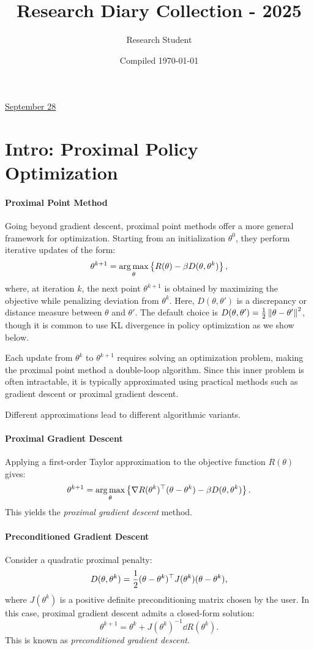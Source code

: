 \documentclass[letterpaper,11pt]{article}
\title{Research Diary Collection - 2025}
\author{Research Student}
\date{Compiled \today}
\begin{document}
\tableofcontents
\thispagestyle{empty}
\newpage


\href{run:2025-09-28-2.tex}{\Huge September 28} 

\section{Intro: Proximal Policy Optimization}

\paragraph{Proximal Point Method} 
Going beyond gradient descent, proximal point methods offer a more general framework for optimization. Starting from an initialization $\theta^0$, they perform iterative updates of the form:
$$
\theta^{k+1} = \argmax_{\theta} 
  \left \{ R(\theta) - \beta D(\theta, \theta^k) \right \},
$$
where, at iteration $k$, the next point $\theta^{k+1}$ is obtained by maximizing the objective while penalizing deviation from $\theta^k$. Here, $D(\theta, \theta')$ is a discrepancy or distance measure between $\theta$ and $\theta'$. The default choice is $D(\theta, \theta') = \frac{1}{2}\norm{\theta - \theta'}^2$, though it is common to use KL divergence in policy optimization as we show below. 

Each update from $\theta^k$ to $\theta^{k+1}$ requires solving an optimization problem, making the proximal point method a double-loop algorithm. Since this inner problem is often intractable, it is typically approximated using practical methods such as gradient descent or proximal gradient descent. 

Different approximations lead to different algorithmic variants.




\paragraph{Proximal Gradient Descent} 
Applying a first-order Taylor approximation to the objective function $R(\theta)$ gives:
$$
\theta^{k+1} = \argmax_{\theta} 
  \left \{ \dd R(\theta^k) \tt (\theta - \theta^k) - \beta D(\theta, \theta^k) \right \}.
$$
This yields the \emph{proximal gradient descent} method.

\paragraph{Preconditioned Gradient Descent}
Consider a quadratic proximal penalty:
$$
D(\theta, \theta^k) = \frac{1}{2}(\theta-\theta^k)\tt J(\theta^k)(\theta - \theta^k),
$$
where $J(\theta^k)$ is a positive definite preconditioning matrix chosen by the user. In this case, proximal gradient descent admits a closed-form solution:
$$
\theta^{k+1} = \theta^k + J(\theta^k)^{-1} \dd R(\theta^k).
$$
This is known as \emph{preconditioned gradient descent}.
\end{document}
